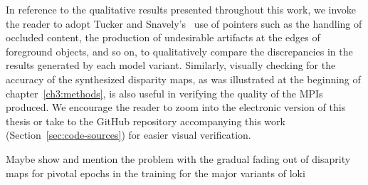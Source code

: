 In reference to the qualitative results presented throughout this work, we invoke the reader to adopt Tucker and Snavely's~\cite{single_view_mpi} use of pointers such as the handling of occluded content, the production of undesirable artifacts at the edges of foreground objects, and so on, to qualitatively compare the discrepancies in the results generated by each model variant. Similarly, visually checking for the accuracy of the synthesized disparity maps, as was illustrated at the beginning of chapter~\ref{ch3:methods}, is also useful in verifying the quality of the MPIs produced. We encourage the reader to zoom into the electronic version of this thesis or take to the GitHub repository accompanying this work (Section~\ref{sec:code-sources}) for easier visual verification.




Maybe show and mention the problem with the gradual fading out of disaprity maps for pivotal epochs in the training for the major variants of loki

